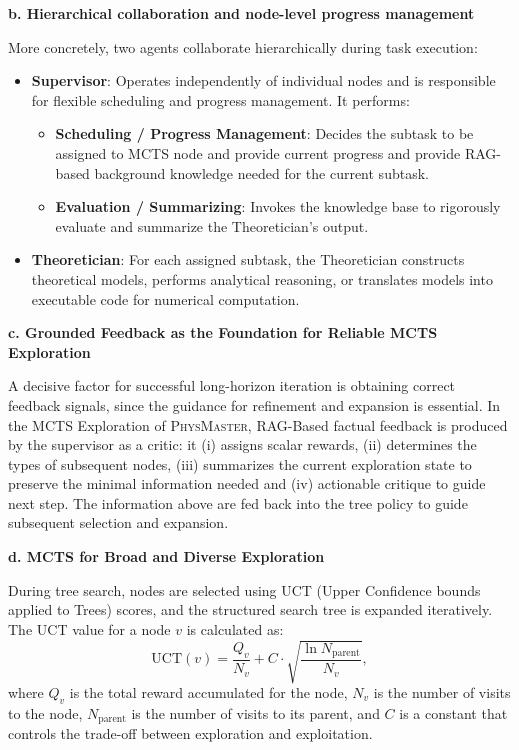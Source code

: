 \documentclass[11pt, a4paper, logo, copyright, nonumbering]{SAI}
\newcommand{\agent}{\textsc{PhysMaster}\xspace}
\begin{document}
\noindent \textbf{b. Hierarchical collaboration and node-level progress management}

More concretely, two agents collaborate hierarchically during task execution:
\begin{itemize}
    \item \textbf{Supervisor}: Operates independently of individual nodes and is responsible for flexible scheduling and progress management. It performs:
    \begin{itemize}
        \item \textbf{Scheduling / Progress Management}: Decides the subtask to be assigned to MCTS node and provide current progress and provide RAG-based background knowledge needed for the current subtask.
        \item \textbf{Evaluation / Summarizing}: Invokes the knowledge base to rigorously evaluate and summarize the Theoretician's output.
    \end{itemize}
    \item \textbf{Theoretician}: For each assigned subtask, the Theoretician constructs theoretical models, performs analytical reasoning, or translates models into executable code for numerical computation.
\end{itemize}

\noindent \textbf{c. Grounded Feedback as the Foundation for Reliable MCTS Exploration}

A decisive factor for successful long-horizon iteration is obtaining correct feedback signals, since the guidance for refinement and expansion is essential. In the MCTS Exploration of \agent, RAG-Based factual feedback is produced by the supervisor as a critic: it (i) assigns scalar rewards, (ii) determines the types of subsequent nodes, (iii) summarizes the current exploration state to preserve the minimal information needed and (iv) actionable critique to guide next step. The information above are fed back into the tree policy to guide subsequent selection and expansion.

\noindent \textbf{d. MCTS for Broad and Diverse Exploration}

During tree search, nodes are selected using UCT (Upper Confidence bounds applied to Trees) scores, and the structured search tree is expanded iteratively. The UCT value for a node \( v \) is calculated as:
\[
\text{UCT}(v) = \frac{Q_v}{N_v} + C \cdot \sqrt{\frac{\ln N_{\text{parent}}}{N_v}},
\]
where \( Q_v \) is the total reward accumulated for the node, \( N_v \) is the number of visits to the node, \( N_{\text{parent}} \) is the number of visits to its parent, and \( C \) is a constant that controls the trade-off between exploration and exploitation. 
\end{document}
